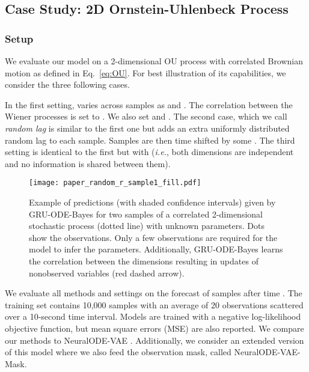 \documentclass{article}
\newcommand{\method}{GRU-ODE-Bayes}
\begin{document}
\subsection{Case Study: 2D Ornstein-Uhlenbeck Process}
\label{sec:2d-ou-experiments}
\subsubsection{Setup}
We evaluate our model on a 2-dimensional OU process with correlated Brownian motion as defined in Eq.~\ref{eq:OU}. For best illustration of its capabilities, we consider the three following cases. 

In the first setting,  varies across samples as  and . The correlation between the Wiener processes  is set to . We also set  and . The second case, which we call \emph{random lag} is similar to the first one but adds an extra uniformly distributed random lag to each sample. Samples are then time shifted by some . The third setting is identical to the first but with  (\emph{i.e.}, both dimensions are independent and no information is shared between them).


\begin{figure}[hbt]
\centering
\centerline{\texttt{[image: paper\_random\_r\_sample1\_fill.pdf]}}
\caption{
Example of predictions (with shaded confidence intervals) given by \method{} for two samples of a correlated 2-dimensional stochastic process  (dotted line) with unknown parameters. Dots show the observations. Only a few observations are required for the model to infer the parameters. Additionally, \method{} learns the correlation between the dimensions resulting in updates of nonobserved variables (red dashed arrow). 
}
\label{fig:setup-figure}
\end{figure}

We evaluate all methods and settings on the forecast of samples after time . The training set contains 10,000 samples with an average of 20 observations scattered over a 10-second time interval. Models are trained with a negative log-likelihood objective function, but mean square errors (MSE) are also reported. We compare our methods to NeuralODE-VAE \citep{neural_ode}. Additionally, we consider an extended version of this model where we also feed the observation mask, called NeuralODE-VAE-Mask.
\end{document}
